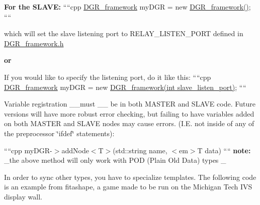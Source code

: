 \begin{DoxyItemize}
{\bfseries For the S\+L\+A\+V\+E\+:} ````cpp \hyperlink{classDGR__framework}{D\+G\+R\+\_\+framework} my\+D\+G\+R = new \hyperlink{classDGR__framework}{D\+G\+R\+\_\+framework()}; ````

which will set the slave listening port to R\+E\+L\+A\+Y\+\_\+\+L\+I\+S\+T\+E\+N\+\_\+\+P\+O\+R\+T defined in \hyperlink{DGR__framework_8h_source}{D\+G\+R\+\_\+framework.\+h}

{\bfseries or}

If you would like to specify the listening port, do it like this\+: ````cpp \hyperlink{classDGR__framework}{D\+G\+R\+\_\+framework} my\+D\+G\+R = new \hyperlink{classDGR__framework}{D\+G\+R\+\_\+framework(int slave\+\_\+listen\+\_\+port)}; ````
\item Variable registration \+\_\+\+\_\+must \+\_\+\+\_\+ be in both M\+A\+S\+T\+E\+R and S\+L\+A\+V\+E code. Future versions will have more robust error checking, but failing to have variables added on both M\+A\+S\+T\+E\+R and S\+L\+A\+V\+E nodes may cause errors. (I.\+E. not inside of any of the preprocessor \char`\"{}ifdef\char`\"{} statements)\+:

````cpp my\+D\+G\+R-\/$>$add\+Node$<$\+T$>$(std\+::string name, $<$em$>$\+T data) ```` {\bfseries note\+:} \+\_\+the above method will only work with P\+O\+D (Plain Old Data) types \+\_\+

In order to sync other types, you have to specialize templates. The following code is an example from fitashape, a game made to be run on the Michigan Tech I\+V\+S display wall.


\end{DoxyItemize}
